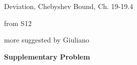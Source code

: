 \documentclass[handout]{mcs}
\begin{document}

\begin{staffnotes}
Deviation, Chebyshev Bound, Ch. 19-19.4
\end{staffnotes}

\begin{staffnotes}
from S12
\end{staffnotes}


\begin{staffnotes}
more suggested by Giuliano
\end{staffnotes}


\begin{center}
\textbf{Supplementary Problem}
\end{center}





\end{document}
